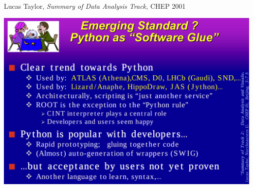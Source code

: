 \documentclass[aspectratio=169]{beamer}
\begin{document}
\begin{frame}{Lucas Taylor, {\it Summary of Data Analysis Track,} CHEP 2001}
\vspace{0.15 cm}
\begin{center}
\includegraphics[width=0.81\linewidth]{PLOTS/chep-2001-python.png}
\end{center}
\end{frame}
\end{document}
